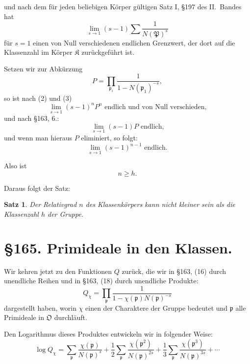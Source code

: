 \documentclass[12pt,a4paper]{article}
\newtheorem*{satz}{Satz}
\begin{document}
und nach dem f\"ur jeden beliebigen K\"orper g\"ultigen Satz I, \S 197 des II.~Bandes hat
\begin{equation}\lim_{s \to 1} (s-1) \sum \frac{1}{N(\mathfrak{P})^s}\end{equation}
f\"ur $s = 1$ einen von Null verschiedenen endlichen Grenzwert, der dort auf die Klassenzahl im K\"orper $\mathfrak{K}$ zur\"uckgef\"uhrt ist.

Setzen wir zur Abk\"urzung
\[P = \prod_{\mathfrak{p}_1} \frac{1}{1 - N(\mathfrak{p}_1)^{-s}},\]
so ist nach (2) und (3)
\begin{equation}\lim_{s \to 1} (s-1)^n P^n \text{ endlich und von Null verschieden,}\end{equation}
und nach \S 163, 6.:
\begin{equation}\lim_{s \to 1} (s-1) P \text{ endlich,}\end{equation}
und wenn man hieraus $P$ eliminiert, so folgt:
\[\lim_{s \to 1} (s-1)^{n-1} \text{ endlich.}\]

Also ist
\begin{equation}n \geq h.\end{equation}

Daraus folgt der Satz:

\begin{satz}
Der Relativgrad $n$ des Klassenk\"orpers kann nicht kleiner sein als die Klassenzahl $h$ der Gruppe.
\end{satz}

\section*{\S 165. Primideale in den Klassen.}

Wir kehren jetzt zu den Funktionen $Q$ zur\"uck, die wir in \S 163, (16) durch unendliche Reihen und in \S 163, (18) durch unendliche Produkte:
\[Q_\chi = \prod_{\mathfrak{p}} \frac{1}{1 - \chi(\mathfrak{p}) N(\mathfrak{p})^{-s}}\]
dargestellt haben, worin $\chi$ einen der Charaktere der Gruppe bedeutet und $\mathfrak{p}$ alle Primideale in $\mathfrak{O}$ durchl\"auft.

Den Logarithmus dieses Produktes entwickeln wir in folgender Weise:
\begin{equation}\log Q_\chi = \sum_{\mathfrak{p}} \frac{\chi(\mathfrak{p})}{N(\mathfrak{p})^s} + \frac{1}{2} \sum_{\mathfrak{p}} \frac{\chi(\mathfrak{p}^2)}{N(\mathfrak{p})^{2s}} + \frac{1}{3} \sum_{\mathfrak{p}} \frac{\chi(\mathfrak{p}^3)}{N(\mathfrak{p})^{3s}} + \cdots\end{equation}
\end{document}
